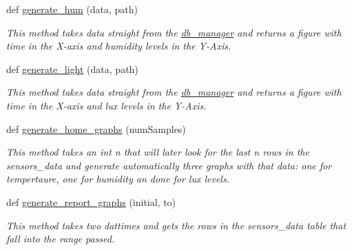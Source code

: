\begin{DoxyCompactItemize}
def \hyperlink{namespacegraph__functions_a2dd7588fd40c25a37c8ef2989108a95d}{generate\+\_\+hum} (data, path)
\begin{DoxyCompactList}\small\item\em This method takes data straight from the \textquotesingle{}\hyperlink{namespacedb__manager}{db\+\_\+manager}\textquotesingle{} and returns a figure with time in the X-\/axis and humidity levels in the Y-\/\+Axis. \end{DoxyCompactList}\item 
def \hyperlink{namespacegraph__functions_a543a2d6ea7c3aadf374c8ee6d4d0f363}{generate\+\_\+light} (data, path)
\begin{DoxyCompactList}\small\item\em This method takes data straight from the \textquotesingle{}\hyperlink{namespacedb__manager}{db\+\_\+manager}\textquotesingle{} and returns a figure with time in the X-\/axis and lux levels in the Y-\/\+Axis. \end{DoxyCompactList}\item 
def \hyperlink{namespacegraph__functions_aa95a646a4b7dc2ddb3e399bc82be75e6}{generate\+\_\+home\+\_\+graphs} (num\+Samples)
\begin{DoxyCompactList}\small\item\em This method takes an int \textquotesingle{}n\textquotesingle{} that will later look for the last \textquotesingle{}n\textquotesingle{} rows in the \textquotesingle{}sensors\+\_\+data\textquotesingle{} and generate automatically three graphs with that data\+: one for tempertaure, one for humidity an done for lux levels. \end{DoxyCompactList}\item 
def \hyperlink{namespacegraph__functions_a96b23c65bf5aeb2997f22e3972c9f4d1}{generate\+\_\+report\+\_\+graphs} (initial, to)
\begin{DoxyCompactList}\small\item\em This method takes two dattimes and gets the rows in the \textquotesingle{}sensors\+\_\+data\textquotesingle{} table that fall into the range passed. \end{DoxyCompactList}\end{DoxyCompactItemize}
